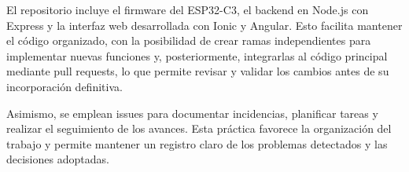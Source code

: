 El repositorio incluye el firmware del ESP32-C3, el backend en Node.js con Express y la interfaz web desarrollada con Ionic y Angular. Esto facilita mantener el código organizado, con la posibilidad de crear ramas independientes para implementar nuevas funciones y, posteriormente, integrarlas al código principal mediante pull requests, lo que permite revisar y validar los cambios antes de su incorporación definitiva.

Asimismo, se emplean issues para documentar incidencias, planificar tareas y realizar el seguimiento de los avances. Esta práctica favorece la organización del trabajo y permite mantener un registro claro de los problemas detectados y las decisiones adoptadas.


